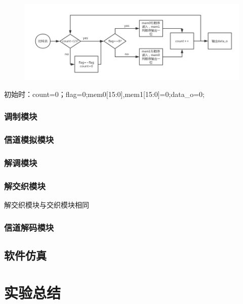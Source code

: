 \documentclass[UTF8]{ctexart}
\begin{document}
\begin{figure}[H]
    \centering
    \includegraphics[width=\textwidth]{images//inter_pic.png}
\end{figure}

初始时：count=0；flag=0;mem0[15:0],mem1[15:0]=0;data\_o=0;

\newpage


\subsubsection{调制模块}

\subsubsection{信道模拟模块}

\subsubsection{解调模块}

\subsubsection{解交织模块}

解交织模块与交织模块相同

\subsubsection{信道解码模块}


\subsection{软件仿真}


\section{实验总结}

\end{document}
